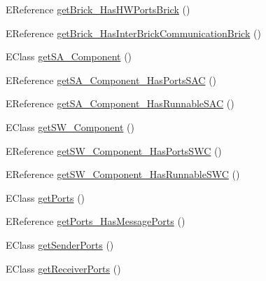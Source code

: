 \begin{DoxyCompactItemize}
\item 
E\-Reference \hyperlink{classshootingmachineemfmodel_1_1impl_1_1_shootingmachineemfmodel_package_impl_aeeaf785ee182d53d711cb4e062e712f1}{get\-Brick\-\_\-\-Has\-H\-W\-Ports\-Brick} ()
\item 
E\-Reference \hyperlink{classshootingmachineemfmodel_1_1impl_1_1_shootingmachineemfmodel_package_impl_a76fbaa6f2b67c8092ba78915536a5a8f}{get\-Brick\-\_\-\-Has\-Inter\-Brick\-Communication\-Brick} ()
\item 
E\-Class \hyperlink{classshootingmachineemfmodel_1_1impl_1_1_shootingmachineemfmodel_package_impl_a8ca2d4f6946a882d7676eef21e132f62}{get\-S\-A\-\_\-\-Component} ()
\item 
E\-Reference \hyperlink{classshootingmachineemfmodel_1_1impl_1_1_shootingmachineemfmodel_package_impl_ae9c82c024aa373a17f5267a574b5f6c7}{get\-S\-A\-\_\-\-Component\-\_\-\-Has\-Ports\-S\-A\-C} ()
\item 
E\-Reference \hyperlink{classshootingmachineemfmodel_1_1impl_1_1_shootingmachineemfmodel_package_impl_a5fe010ad3ccf0838a795b1178bdd5cfc}{get\-S\-A\-\_\-\-Component\-\_\-\-Has\-Runnable\-S\-A\-C} ()
\item 
E\-Class \hyperlink{classshootingmachineemfmodel_1_1impl_1_1_shootingmachineemfmodel_package_impl_aea506b8692fe0c081070fce6bd9295f7}{get\-S\-W\-\_\-\-Component} ()
\item 
E\-Reference \hyperlink{classshootingmachineemfmodel_1_1impl_1_1_shootingmachineemfmodel_package_impl_a708d63c27580eb46e3ac01c6cedeeed9}{get\-S\-W\-\_\-\-Component\-\_\-\-Has\-Ports\-S\-W\-C} ()
\item 
E\-Reference \hyperlink{classshootingmachineemfmodel_1_1impl_1_1_shootingmachineemfmodel_package_impl_afb62ab1dde2242c24e0173440cfbc8dd}{get\-S\-W\-\_\-\-Component\-\_\-\-Has\-Runnable\-S\-W\-C} ()
\item 
E\-Class \hyperlink{classshootingmachineemfmodel_1_1impl_1_1_shootingmachineemfmodel_package_impl_ab434e3a5bfcdf490bed77881dae0841e}{get\-Ports} ()
\item 
E\-Reference \hyperlink{classshootingmachineemfmodel_1_1impl_1_1_shootingmachineemfmodel_package_impl_a07abc10f6558a2e3fd0b2949287b513f}{get\-Ports\-\_\-\-Has\-Message\-Ports} ()
\item 
E\-Class \hyperlink{classshootingmachineemfmodel_1_1impl_1_1_shootingmachineemfmodel_package_impl_a65cf0393c49f9556064a7d50a35b56a1}{get\-Sender\-Ports} ()
\item 
E\-Class \hyperlink{classshootingmachineemfmodel_1_1impl_1_1_shootingmachineemfmodel_package_impl_a821826b4a77ddfe1d4366780aeef3b9c}{get\-Receiver\-Ports} ()

\end{DoxyCompactItemize}
